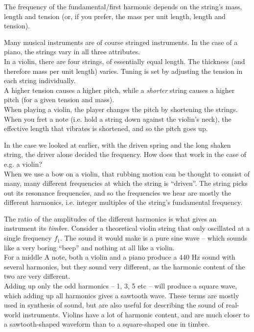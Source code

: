 The frequency of the fundamental/first harmonic depends on the string's mass, length and tension (or, if you prefer, the mass per unit length, length and tension).

Many musical instruments are of course stringed instruments. In the case of a piano, the strings vary in all three attributes.\\
In a violin, there are four strings, of essentially equal length. The thickness (and therefore mass per unit length) varies. Tuning is set by adjusting the tension in each string individually.\\
A higher tension causes a higher pitch, while a \emph{shorter} string causes a higher pitch (for a given tension and mass).\\
When playing a violin, the player changes the pitch by shortening the strings. When you fret a note (i.e. hold a string down against the violin's neck), the effective length that vibrates is shortened, and so the pitch goes up.

In the case we looked at earlier, with the driven spring and the long shaken string, the driver alone decided the frequency. How does that work in the case of e.g. a violin?\\
When we use a bow on a violin, that rubbing motion can be thought to consist of many, many different frequencies at which the string is ``driven''. The string picks out its resonance frequencies, and so the frequencies we hear are mostly the different harmonics, i.e. integer multiples of the string's fundamental frequency.

The ratio of the amplitudes of the different harmonics is what gives an instrument its \emph{timbre}. Consider a theoretical violin string that only oscillated at a single frequency $f_1$. The sound it would make is a pure sine wave -- which sounds like a very boring ``beep'' and nothing at all like a violin.\\
For a middle A note, both a violin and a piano produce a 440 Hz sound with several harmonics, but they sound very different, as the harmonic content of the two are very different.\\
Adding up only the odd harmonics -- 1, 3, 5 etc -- will produce a square wave, which adding up all harmonics gives a sawtooth wave. These terms are mostly used in synthesis of sound, but are also useful for describing the sound of real-world instruments. Violins have a lot of harmonic content, and are much closer to a sawtooth-shaped waveform than to a square-shaped one in timbre.

